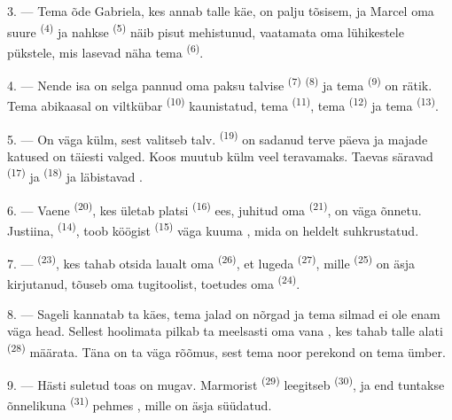 3. --- Tema õde Gabriela, kes annab talle käe, on palju tõsisem, ja Marcel oma suure
 \textsuperscript{(4)} ja nahkse  \textsuperscript{(5)} näib
pisut mehistunud, vaatamata oma lühikestele pükstele, mis lasevad näha tema
 \textsuperscript{(6)}.

4. --- Nende isa on selga pannud oma paksu talvise 
\textsuperscript{(7)}  \textsuperscript{(8)} ja tema
 \textsuperscript{(9)} on rätik. Tema abikaasal on viltkübar
 \textsuperscript{(10)} kaunistatud, tema 
\textsuperscript{(11)}, tema  \textsuperscript{(12)} ja tema 
\textsuperscript{(13)}.

5. --- On väga külm, sest valitseb talv.  \textsuperscript{(19)} on sadanud
terve päeva ja majade katused on täiesti valged. Koos  muutub külm veel
teravamaks. Taevas säravad  \textsuperscript{(17)} ja 
\textsuperscript{(18)} ja läbistavad .

\VUsaut{4.2mm}
\VUsaut{3.0mm}

6. --- Vaene  \textsuperscript{(20)}, kes ületab platsi 
\textsuperscript{(16)} ees, juhitud oma  \textsuperscript{(21)}, on väga
õnnetu. Justiina,  \textsuperscript{(14)}, toob köögist 
\textsuperscript{(15)} väga kuuma , mida on heldelt suhkrustatud.

7. ---  \textsuperscript{(23)}, kes tahab otsida laualt oma
 \textsuperscript{(26)}, et lugeda 
\textsuperscript{(27)}, mille  \textsuperscript{(25)} on äsja kirjutanud,
tõuseb oma tugitoolist, toetudes oma  \textsuperscript{(24)}.

8. --- Sageli kannatab ta  käes, tema
jalad on nõrgad ja tema silmad ei ole enam väga head. Sellest hoolimata pilkab ta
meelsasti oma vana , kes tahab talle alati 
\textsuperscript{(28)} määrata. Täna on ta väga rõõmus, sest tema noor perekond on tema
ümber.

9. --- Hästi suletud toas on mugav. Marmorist  \textsuperscript{(29)}
leegitseb  \textsuperscript{(30)}, ja end tuntakse õnnelikuna
 \textsuperscript{(31)} pehmes , mille on äsja süüdatud.

